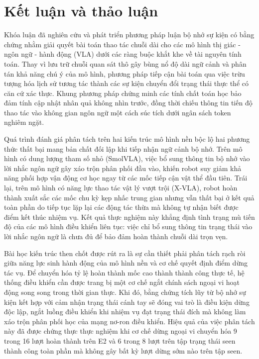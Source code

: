 \chapter{Kết luận và thảo luận}

Khóa luận đã nghiên cứu và phát triển phương pháp luận bộ nhớ sự kiện có bằng chứng nhằm giải quyết bài toán thao tác chuỗi dài cho các mô hình thị giác - ngôn ngữ - hành động (VLA) dưới các ràng buộc khắt khe về tài nguyên tính toán. Thay vì lưu trữ chuỗi quan sát thô gây bùng nổ độ dài ngữ cảnh và phân tán khả năng chú ý của mô hình, phương pháp tiếp cận bài toán qua việc trừu tượng hóa lịch sử tương tác thành các sự kiện chuyển đổi trạng thái thực thể có căn cứ xác thực. Khung phương pháp chứng minh các tính chất toán học bảo đảm tính cập nhật nhân quả không nhìn trước, đồng thời chiếu thông tin tiến độ thao tác vào không gian ngôn ngữ một cách súc tích dưới ngân sách token nghiêm ngặt.

Quá trình đánh giá phân tách trên hai kiến trúc mô hình nền bộc lộ hai phương thức thất bại mang bản chất đối lập khi tiếp nhận ngữ cảnh bộ nhớ. Trên mô hình có dung lượng tham số nhỏ (SmolVLA), việc bổ sung thông tin bộ nhớ vào lời nhắc ngôn ngữ gây xáo trộn phân phối đầu vào, khiến robot suy giảm khả năng phối hợp vận động cơ học ngay từ các mốc tiếp cận vật thể đầu tiên. Trái lại, trên mô hình có năng lực thao tác vật lý vượt trội (X-VLA), robot hoàn thành xuất sắc các mốc chu kỳ kẹp nhấc trung gian nhưng vẫn thất bại ở kết quả toàn phần do tiếp tục lặp lại các động tác thừa mà không tự nhận biết được điểm kết thúc nhiệm vụ. Kết quả thực nghiệm này khẳng định tình trạng mù tiến độ của các mô hình điều khiển liên tục: việc chỉ bổ sung thông tin trạng thái vào lời nhắc ngôn ngữ là chưa đủ để bảo đảm hoàn thành chuỗi dài trọn vẹn.

Bài học kiến trúc then chốt được rút ra là sự cần thiết phải phân tách rạch ròi giữa năng lực sinh hành động của mô hình nền và cơ chế quyết định điểm dừng tác vụ. Để chuyển hóa tỷ lệ hoàn thành mốc cao thành thành công thực tế, hệ thống điều khiển cần được trang bị một cơ chế ngắt chính sách ngoại vi hoạt động song song trong thời gian thực. Khi đó, bằng chứng tích lũy từ bộ nhớ sự kiện kết hợp với cảm nhận trạng thái cánh tay sẽ đóng vai trò là điều kiện dừng độc lập, ngắt luồng điều khiển khi nhiệm vụ đạt trạng thái đích mà không làm xáo trộn phân phối học của mạng nơ-ron điều khiển. Hiệu quả của việc phân tách này đã được chứng thực thực nghiệm khi cơ chế dừng ngoại vi chuyển hóa 9 trong 16 lượt hoàn thành trên E2 và 6 trong 8 lượt trên tập trạng thái seen thành công toàn phần mà không gây bất kỳ lượt dừng sớm nào trên tập seen.

